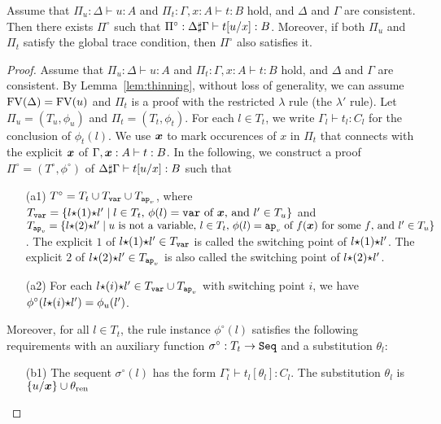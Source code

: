 \begin{lemma}
  Assume that $\Pi_u: \Delta \vdash u:A$ and $\Pi_t:\Gamma,x:A \vdash t:B$ hold,
  and $\Delta$ and $\Gamma$ are consistent. 
  Then there exists $\Pi^\circ$ such that $\Pi^\circ:\Delta\sharp\Gamma \vdash t[u/x]:B$. 
  Moreover, if both $\Pi_u$ and $\Pi_t$ satisfy the global trace condition,
  then $\Pi^\circ$ also satisfies it. 
\end{lemma}
\begin{proof}
  Assume that $\Pi_u: \Delta \vdash u:A$ and $\Pi_t:\Gamma,x:A \vdash t:B$ hold,
  and $\Delta$ and $\Gamma$ are consistent. 
  By Lemma~\ref{lem:thinning}, without loss of generality,
  we can assume ${{\rm FV}}(\Delta) = {{\rm FV}}(u)$ and $\Pi_t$ is a proof with the restricted $\lambda$ rule (the $\lambda'$ rule). 
  Let $\Pi_u=(T_u,\phi_u)$ and $\Pi_t=(T_t,\phi_t)$.
  For each $l\in T_t$, we write $\Gamma_l\vdash t_l:C_l$
  for the conclusion of $\phi_t(l)$.
  We use $\boldsymbol{x}$ to mark occurences of $x$ in $\Pi_t$ that connects
  with the explicit $\boldsymbol{x}$ of $\Gamma,\boldsymbol{x}:A\vdash t:B$. 
  In the following, we construct a proof $\Pi^\circ = (T^\circ,\phi^\circ)$ of
  $\Delta\sharp\Gamma\vdash t[u/x]:B$ such that 
  \begin{itemize}
  \item[(a1)]
    $T^\circ = T_t \cup T_{{\tt var}} \cup T_{{{\tt ap}_{\mbox{\tiny $v$}}}}$, where
    $T_{{\tt var}} = \{l{\star}(1){\star} l' \mid \text{$l\in T_t$, $\phi(l)={\tt var}$ of $\boldsymbol{x}$, and $l'\in T_u$} \}$
    and
    $T_{{{\tt ap}_{\mbox{\tiny $v$}}}} = \{l{\star}(2){\star} l' \mid \text{$u$ is not a variable, $l\in T_t$, $\phi(l)={{\tt ap}_{\mbox{\tiny $v$}}}$ of $f(\boldsymbol{x})$ for some $f$, and $l'\in T_u$}\}$.
    The explicit $1$ of $l{\star}(1){\star} l' \in T_{\tt var}$ is called the switching point of $l{\star}(1){\star} l'$.
    The explicit $2$ of $l{\star}(2){\star} l' \in T_{{\tt ap}_{\mbox{\tiny $v$}}}$ is also called the switching point of $l{\star}(2){\star} l'$.     \item[(a2)]
    For each $l{\star}(i){\star} l' \in T_{\tt var} \cup T_{{\tt ap}_{\mbox{\tiny $v$}}}$ with switching point $i$,
    we have $\phi^\circ(l{\star}(i){\star} l') = \phi_u(l')$. 
  \end{itemize}
  Moreover, for all $l \in T_t$,
  the rule instance $\phi^\circ(l)$ satisfies the following requirements
  with an auxiliary function $\sigma^\circ:T_t \to {\tt Seq}$ and a substitution $\theta_l$: 
  \begin{itemize}
  \item[(b1)]
    The sequent $\sigma^\circ(l)$ has the form $\Gamma^\circ_l\vdash t_l[\theta_l]:C_l$.
    The substitution $\theta_l$ is $\{u/\boldsymbol{x}\}\cup\theta_{{\rm ren}}$

\end{itemize}
\end{proof}
